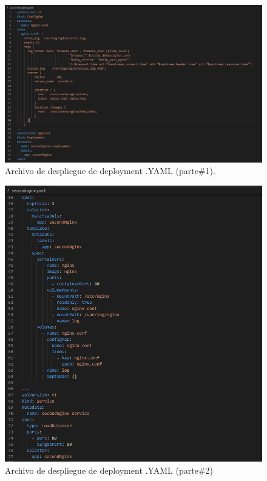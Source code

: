 \begin{figure}[htpb!]
	\centering
	\includegraphics[width=0.95\columnwidth]{images/captures/podnginx/second01.PNG}
	\caption{Archivo de despliegue de deployment .YAML (parte\#1).}
	\label{fig:yml01}
\end{figure}

\begin{figure}[htpb!]
	\centering
	\includegraphics[width=0.95\columnwidth]{images/captures/podnginx/second02.PNG}
	\caption{Archivo de despliegue de deployment .YAML (parte\#2)}
	\label{fig:yml02}
\end{figure}

